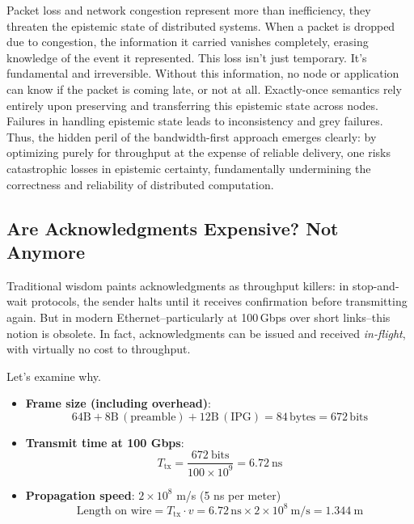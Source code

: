 \documentclass[../OAE-SPEC-MAIN.tex]{subfiles}
\begin{document}
Packet loss and network congestion represent more than inefficiency, they threaten the epistemic state of distributed systems. When a packet is dropped due to congestion, the information it carried vanishes completely, erasing knowledge of the event it represented. This loss isn't just temporary. It's fundamental and irreversible. Without this information, no node or application can know if the packet is coming late, or not at all. Exactly-once semantics rely entirely upon preserving and transferring this epistemic state across nodes. Failures in handling epistemic state leads to inconsistency and grey failures. Thus, the hidden peril of the bandwidth-first approach emerges clearly: by optimizing purely for throughput at the expense of reliable delivery, one risks catastrophic losses in epistemic certainty, fundamentally undermining the correctness and reliability of distributed computation.


\subsection{Are Acknowledgments Expensive? Not Anymore}

Traditional wisdom paints acknowledgments as throughput killers: in stop-and-wait protocols, the sender halts until it receives confirmation before transmitting again. But in modern Ethernet--particularly at 100\,Gbps over short links--this notion is obsolete. In fact, acknowledgments can be issued and received \emph{in-flight}, with virtually no cost to throughput.

Let’s examine why.

\begin{itemize}
  \item \textbf{Frame size (including overhead)}:
  \[
  64\text{B} + 8\text{B}\,(\text{preamble}) + 12\text{B}\,(\text{IPG}) = 84\,\text{bytes} = 672\,\text{bits}
  \]
  \item \textbf{Transmit time at 100 Gbps}:
  \[
  T_{\text{tx}} = \frac{672\ \text{bits}}{100 \times 10^9} = 6.72\ \text{ns}
  \]
  \item \textbf{Propagation speed}: \(2 \times 10^8\) m/s (5 ns per meter)
  \[
  \text{Length on wire} = T_{\text{tx}} \cdot v = 6.72\,\text{ns} \times 2 \times 10^8\ \text{m/s} = 1.344\ \text{m}
  \]
\end{itemize}
\vspace{1em}
\end{document}
